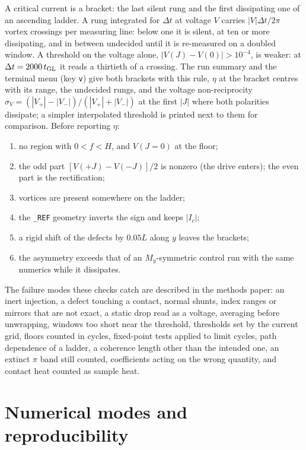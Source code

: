 \documentclass[11pt,a4paper]{article}
\newcommand{\code}[1]{\texttt{#1}}
\begin{document}
A critical current is a bracket: the last silent rung and the first
dissipating one of an ascending ladder. A rung integrated for $\Delta t$ at
voltage $V$ carries $|V|\Delta t/2\pi$ vortex crossings per measuring line:
below one it is silent, at ten or more dissipating, and in between undecided
until it is re-measured on a doubled window. A threshold on the voltage
alone, $|V(J)-V(0)|>10^{-4}$, is weaker: at $\Delta t=2000\,t_{\rm GL}$ it
reads a thirtieth of a crossing. The run summary and the terminal menu (key
\code{v}) give both brackets with this rule, $\eta$ at the bracket centres
with its range, the undecided rungs, and the voltage non-reciprocity
$\sigma_V=(|V_+|-|V_-|)/(|V_+|+|V_-|)$ at the first $|J|$ where both
polarities dissipate; a simpler interpolated threshold is printed next to
them for comparison. Before reporting $\eta$:
\begin{enumerate}
\item no region with $0<f<H$, and $V(J=0)$ at the floor;
\item the odd part $[V(+J)-V(-J)]/2$ is nonzero (the drive enters); the
  even part is the rectification;
\item vortices are present somewhere on the ladder;
\item the \code{\_REF} geometry inverts the sign and keeps $|I_c|$;
\item a rigid shift of the defects by $0.05L$ along $y$ leaves the brackets;
\item the asymmetry exceeds that of an $M_y$-symmetric control run with the
  same numerics while it dissipates.
\end{enumerate}
The failure modes these checks catch are described in the methods paper:
an inert injection, a defect touching a contact, normal shunts, index
ranges or mirrors that are not exact, a static drop read as a voltage,
averaging before unwrapping, windows too short near the threshold,
thresholds set by the current grid, floors counted in cycles, fixed-point
tests applied to limit cycles, path dependence of a ladder, a coherence
length other than the intended one, an extinct $\pi$ band still counted,
coefficients acting on the wrong quantity, and contact heat counted as
sample heat.

\section{Numerical modes and reproducibility}
\end{document}
